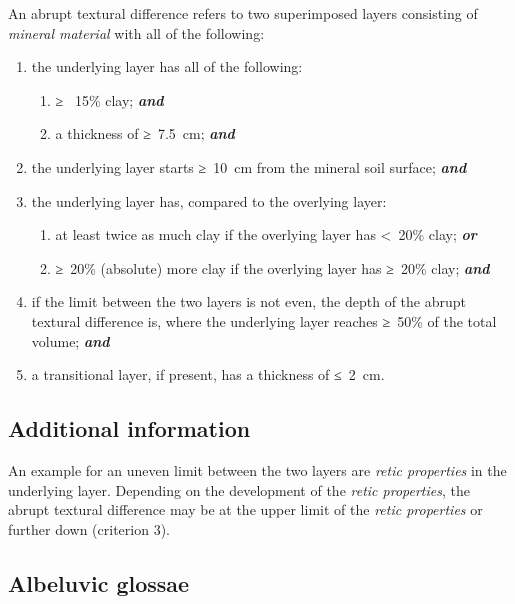 \documentclass[
  letterpaper,
  DIV=11,
  numbers=noendperiod]{scrreprt}
\providecommand{\tightlist}{%
  \setlength{\itemsep}{0pt}\setlength{\parskip}{0pt}}\usepackage{longtable,booktabs,array}
\begin{document}
An abrupt textural difference refers to two superimposed layers
consisting of \emph{mineral material} with all of the following:

\begin{enumerate}
\def\labelenumi{\arabic{enumi}.}
\item
  the underlying layer has all of the following:

  \begin{enumerate}
  \def\labelenumii{\alph{enumii}.}
  \tightlist
  \item
    ≥~ 15\% clay; \textbf{\emph{and}}
  \item
    a thickness of ≥~7.5~cm; \textbf{\emph{and}}
  \end{enumerate}
\item
  the underlying layer starts ≥~10~cm from the mineral soil surface;
  \textbf{\emph{and}}
\item
  the underlying layer has, compared to the overlying layer:

  \begin{enumerate}
  \def\labelenumii{\alph{enumii}.}
  \tightlist
  \item
    at least twice as much clay if the overlying layer has
    \textless~20\% clay; \textbf{\emph{or}}
  \item
    ≥~20\% (absolute) more clay if the overlying layer has ≥~20\% clay;
    \textbf{\emph{and}}
  \end{enumerate}
\item
  if the limit between the two layers is not even, the depth of the
  abrupt textural difference is, where the underlying layer reaches
  ≥~50\% of the total volume; \textbf{\emph{and}}
\item
  a transitional layer, if present, has a thickness of ≤~2~cm.
\end{enumerate}

\hypertarget{additional-information-22}{%
\subsection{Additional information}\label{additional-information-22}}

An example for an uneven limit between the two layers are \emph{retic
properties} in the underlying layer. Depending on the development of the
\emph{retic properties}, the abrupt textural difference may be at the
upper limit of the \emph{retic properties} or further down (criterion
3).

\hypertarget{albeluvic-glossae}{%
\subsection{Albeluvic glossae}\label{albeluvic-glossae}}
\end{document}
